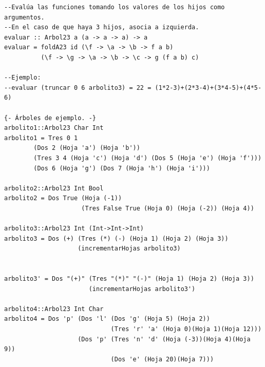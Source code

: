 \documentclass[a4paper]{article}
\begin{document}
\begin{verbatim}
--Evalúa las funciones tomando los valores de los hijos como argumentos.
--En el caso de que haya 3 hijos, asocia a izquierda.
evaluar :: Arbol23 a (a -> a -> a) -> a
evaluar = foldA23 id (\f -> \a -> \b -> f a b)
          (\f -> \g -> \a -> \b -> \c -> g (f a b) c)

--Ejemplo:
--evaluar (truncar 0 6 arbolito3) = 22 = (1*2-3)+(2*3-4)+(3*4-5)+(4*5-6)

{- Árboles de ejemplo. -}
arbolito1::Arbol23 Char Int
arbolito1 = Tres 0 1
        (Dos 2 (Hoja 'a') (Hoja 'b'))
        (Tres 3 4 (Hoja 'c') (Hoja 'd') (Dos 5 (Hoja 'e') (Hoja 'f')))
        (Dos 6 (Hoja 'g') (Dos 7 (Hoja 'h') (Hoja 'i')))

arbolito2::Arbol23 Int Bool
arbolito2 = Dos True (Hoja (-1))
                     (Tres False True (Hoja 0) (Hoja (-2)) (Hoja 4))

arbolito3::Arbol23 Int (Int->Int->Int)
arbolito3 = Dos (+) (Tres (*) (-) (Hoja 1) (Hoja 2) (Hoja 3))
                    (incrementarHojas arbolito3)


arbolito3' = Dos "(+)" (Tres "(*)" "(-)" (Hoja 1) (Hoja 2) (Hoja 3))
                       (incrementarHojas arbolito3')

arbolito4::Arbol23 Int Char
arbolito4 = Dos 'p' (Dos 'l' (Dos 'g' (Hoja 5) (Hoja 2))
                             (Tres 'r' 'a' (Hoja 0)(Hoja 1)(Hoja 12)))
                    (Dos 'p' (Tres 'n' 'd' (Hoja (-3))(Hoja 4)(Hoja 9))
                             (Dos 'e' (Hoja 20)(Hoja 7)))
\end{verbatim}
\end{document}
